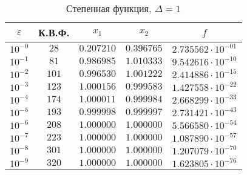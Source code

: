 \documentclass[a4paper,12pt,notitlepage,pdftex,headsepline]{scrartcl}
\begin{document}
        \begin{table}[ht]
          \centering
          \caption{Степенная функция, $\Delta = 1$}
          \begin{tabular}{|c|c|c|c|c|}
            \hline
            $\varepsilon$ & К.В.Ф. & $x_1$ & $x_2$ & $f$\\
            \hline
            $10^{-0}$ & $28$ & $0.207210$ & $0.396765$ & $2.735562\cdot 10^{-01}$\\
            $10^{-1}$ & $81$ & $0.986985$ & $1.010333$ & $9.542616\cdot 10^{-10}$\\
            $10^{-2}$ & $101$ & $0.996530$ & $1.001222$ & $2.414886\cdot 10^{-15}$\\
            $10^{-3}$ & $123$ & $1.000156$ & $0.999583$ & $1.427558\cdot 10^{-22}$\\
            $10^{-4}$ & $174$ & $1.000011$ & $0.999984$ & $2.668299\cdot 10^{-33}$\\
            $10^{-5}$ & $193$ & $0.999998$ & $0.999997$ & $2.731421\cdot 10^{-43}$\\
            $10^{-6}$ & $208$ & $1.000000$ & $1.000000$ & $5.566580\cdot 10^{-54}$\\
            $10^{-7}$ & $223$ & $1.000000$ & $1.000000$ & $1.087890\cdot 10^{-57}$\\
            $10^{-8}$ & $301$ & $1.000000$ & $1.000000$ & $1.207079\cdot 10^{-70}$\\
            $10^{-9}$ & $320$ & $1.000000$ & $1.000000$ & $1.623805\cdot 10^{-76}$\\
            \hline
          \end{tabular}
        \end{table}
\end{document}
